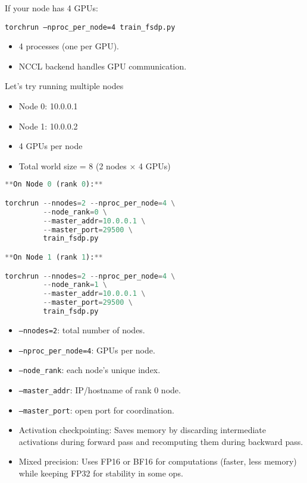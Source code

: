 If your node has 4 GPUs:

\texttt{torchrun --nproc\_per\_node=4 train\_fsdp.py}
\begin{itemize}
	\item 4 processes (one per GPU).
	\item NCCL backend handles GPU communication.
\end{itemize}

Let's try running multiple nodes

\begin{itemize}
	\item Node 0: 10.0.0.1
	\item Node 1: 10.0.0.2
	\item 4 GPUs per node
	\item Total world size = 8 (2 nodes $\times$ 4 GPUs)
\end{itemize}

\begin{lstlisting}[language=Python]
**On Node 0 (rank 0):**

torchrun --nnodes=2 --nproc_per_node=4 \
         --node_rank=0 \
         --master_addr=10.0.0.1 \
         --master_port=29500 \
         train_fsdp.py

**On Node 1 (rank 1):**

torchrun --nnodes=2 --nproc_per_node=4 \
         --node_rank=1 \
         --master_addr=10.0.0.1 \
         --master_port=29500 \
         train_fsdp.py
\end{lstlisting}
\begin{itemize}
	\item \texttt{--nnodes=2}: total number of nodes.
	\item \texttt{--nproc\_per\_node=4}: GPUs per node.
	\item \texttt{--node\_rank}: each node's unique index.
	\item \texttt{--master\_addr}: IP/hostname of rank 0 node.
	\item \texttt{--master\_port}: open port for coordination.
\end{itemize}

\begin{itemize}
	\item Activation checkpointing: Saves memory by discarding intermediate activations during forward pass and recomputing them during backward pass.
	\item Mixed precision: Uses FP16 or BF16 for computations (faster, less memory) while keeping FP32 for stability in some ops.
\end{itemize}

